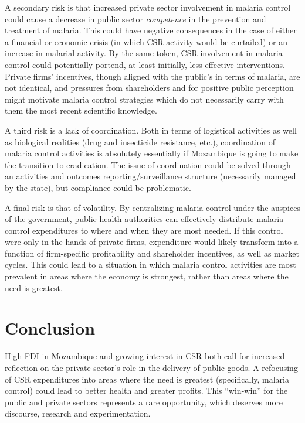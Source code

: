 \documentclass[]{elsarticle} %
\begin{document}
A secondary risk is that increased private sector involvement in malaria
control could cause a decrease in public sector \emph{competence} in the
prevention and treatment of malaria. This could have negative
consequences in the case of either a financial or economic crisis (in
which CSR activity would be curtailed) or an increase in malarial
activity. By the same token, CSR involvement in malaria control could
potentially portend, at least initially, less effective interventions.
Private firms' incentives, though aligned with the public's in terms of
malaria, are not identical, and pressures from shareholders and for
positive public perception might motivate malaria control strategies
which do not necessarily carry with them the most recent scientific
knowledge.

A third risk is a lack of coordination. Both in terms of logistical
activities as well as biological realities (drug and insecticide
resistance, etc.), coordination of malaria control activities is
absolutely essentially if Mozambique is going to make the transition to
eradication. The issue of coordination could be solved through an
activities and outcomes reporting/surveillance structure (necessarily
managed by the state), but compliance could be problematic.

A final risk is that of volatility. By centralizing malaria control
under the auspices of the government, public health authorities can
effectively distribute malaria control expenditures to where and when
they are most needed. If this control were only in the hands of private
firms, expenditure would likely transform into a function of
firm-specific profitability and shareholder incentives, as well as
market cycles. This could lead to a situation in which malaria control
activities are most prevalent in areas where the economy is strongest,
rather than areas where the need is greatest.

\section{Conclusion}\label{conclusion}

High FDI in Mozambique and growing interest in CSR both call for
increased reflection on the private sector's role in the delivery of
public goods. A refocusing of CSR expenditures into areas where the need
is greatest (specifically, malaria control) could lead to better health
and greater profits. This ``win-win'' for the public and private sectors
represents a rare opportunity, which deserves more discourse, research
and experimentation.
\end{document}
